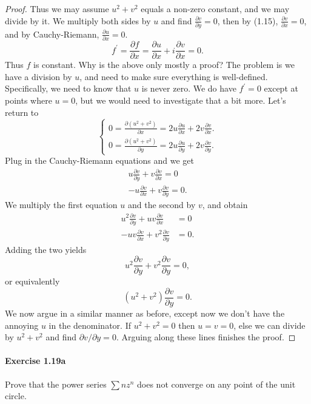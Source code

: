 \documentclass{article}
\begin{document}
\begin{proof}
Thus we may assume $u^2+v^2$ equals a non-zero constant, and we may divide by it. We multiply both sides by $u$ and find $\frac{\partial v}{\partial y}=0$, then by (1.15), $\frac{\partial v}{\partial x}=0$, and by Cauchy-Riemann, $\frac{\partial u}{\partial x}=0$.
$$
f^{\prime}=\frac{\partial f}{\partial x}=\frac{\partial u}{\partial x}+i \frac{\partial v}{\partial x}=0 .
$$
Thus $f$ is constant.
Why is the above only mostly a proof? The problem is we have a division by $u$, and need to make sure everything is well-defined. Specifically, we need to know that $u$ is never zero. We do have $f^{\prime}=0$ except at points where $u=0$, but we would need to investigate that a bit more.
Let's return to
$$
\left\{\begin{array}{l}
0=\frac{\partial\left(u^2+v^2\right)}{\partial x}=2 u \frac{\partial u}{\partial x}+2 v \frac{\partial v}{\partial x} . \\
0=\frac{\partial\left(u^2+v^2\right)}{\partial y}=2 u \frac{\partial u}{\partial y}+2 v \frac{\partial v}{\partial y} .
\end{array}\right.
$$
Plug in the Cauchy-Riemann equations and we get
$$
\begin{array}{r}
u \frac{\partial v}{\partial y}+v \frac{\partial v}{\partial x}=0 \\
-u \frac{\partial v}{\partial x}+v \frac{\partial v}{\partial y}=0 .
\end{array}
$$
We multiply the first equation $u$ and the second by $v$, and obtain
$$
\begin{aligned}
u^2 \frac{\partial v}{\partial y}+u v \frac{\partial v}{\partial x} & =0 \\
-u v \frac{\partial v}{\partial x}+v^2 \frac{\partial v}{\partial y} & =0 .
\end{aligned}
$$
Adding the two yields
$$
u^2 \frac{\partial v}{\partial y}+v^2 \frac{\partial v}{\partial y}=0,
$$
or equivalently
$$
\left(u^2+v^2\right) \frac{\partial v}{\partial y}=0 .
$$
We now argue in a similar manner as before, except now we don't have the annoying $u$ in the denominator. If $u^2+v^2=0$ then $u=v=0$, else we can divide by $u^2+v^2$ and find $\partial v / \partial y=0$. Arguing along these lines finishes the proof.
\end{proof}



\paragraph{Exercise 1.19a} Prove that the power series $\sum nz^n$ does not converge on any point of the unit circle.
\end{document}
